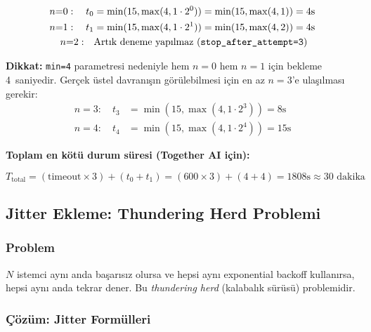 \begin{formulbox}
\begin{align}
n{=}0: \quad t_0 &= \min(15, \max(4, 1 \cdot 2^0)) = \min(15, \max(4, 1)) = 4 \text{s} \label{eq:tenacity-0} \\
n{=}1: \quad t_1 &= \min(15, \max(4, 1 \cdot 2^1)) = \min(15, \max(4, 2)) = 4 \text{s} \label{eq:tenacity-1} \\
n{=}2: \quad & \text{Art{\i}k deneme yap{\i}lmaz (\texttt{stop\_after\_attempt=3})} \notag
\end{align}

\textbf{Dikkat:} \texttt{min=4} parametresi nedeniyle hem $n{=}0$ hem $n{=}1$ i\c{c}in bekleme 4~saniyedir. Ger\c{c}ek \"{u}stel davran{\i}\c{s}{\i}n g\"{o}r\"{u}lebilmesi i\c{c}in en az $n{=}3$'e ula\c{s}{\i}lmas{\i} gerekir:
\begin{align}
n{=}3: \quad t_3 &= \min(15, \max(4, 1 \cdot 2^3)) = 8 \text{s} \\
n{=}4: \quad t_4 &= \min(15, \max(4, 1 \cdot 2^4)) = 15 \text{s}
\end{align}
\end{formulbox}

\textbf{Toplam en k\"{o}t\"{u} durum s\"{u}resi (Together AI i\c{c}in):}

\begin{equation}
T_{\text{total}} = (\text{timeout} \times 3) + (t_0 + t_1) = (600 \times 3) + (4 + 4) = 1808 \text{s} \approx 30 \text{ dakika}
\label{eq:worst-case}
\end{equation}


\subsection{Jitter Ekleme: Thundering Herd Problemi}
\label{sec:jitter}

\subsubsection{Problem}

$N$ istemci ayn{\i} anda ba\c{s}ar{\i}s{\i}z olursa ve hepsi ayn{\i} exponential backoff kullan{\i}rsa, hepsi ayn{\i} anda tekrar dener. Bu \emph{thundering herd} (kalabal{\i}k s\"{u}r\"{u}s\"{u}) problemidir.

\subsubsection{\c{C}\"{o}z\"{u}m: Jitter Form\"{u}lleri}

